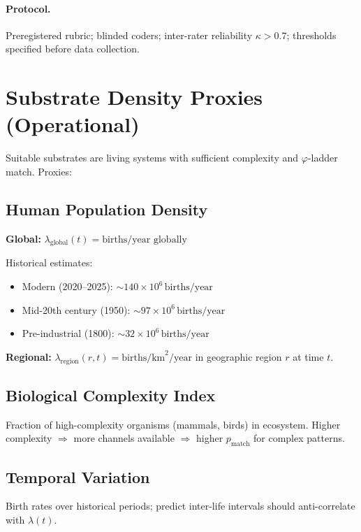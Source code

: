 \documentclass[11pt,letterpaper]{article}
\theoremstyle{definition}
\theoremstyle{remark}
\begin{document}
\paragraph{Protocol.}
Preregistered rubric; blinded coders; inter-rater reliability \(\kappa > 0.7\); thresholds specified before data collection.

\section{Substrate Density Proxies (Operational)}\label{sec:substrate_density}

Suitable substrates are living systems with sufficient complexity and \(\varphi\)-ladder match. Proxies:

\subsection{Human Population Density}

\textbf{Global:} \(\lambda_{\text{global}}(t) = \text{births/year globally}\)

Historical estimates:
\begin{itemize}
  \item Modern (2020--2025): \(\sim\!140\times 10^6\,\text{births/year}\)
  \item Mid-20th century (1950): \(\sim\!97\times 10^6\,\text{births/year}\)
  \item Pre-industrial (1800): \(\sim\!32\times 10^6\,\text{births/year}\)
\end{itemize}

\textbf{Regional:} \(\lambda_{\text{region}}(r,t) = \text{births/km}^2\text{/year}\) in geographic region \(r\) at time \(t\).

\subsection{Biological Complexity Index}

Fraction of high-complexity organisms (mammals, birds) in ecosystem. Higher complexity \(\Rightarrow\) more channels available \(\Rightarrow\) higher \(p_{\text{match}}\) for complex patterns.

\subsection{Temporal Variation}

Birth rates over historical periods; predict inter-life intervals should anti-correlate with \(\lambda(t)\).
\end{document}
